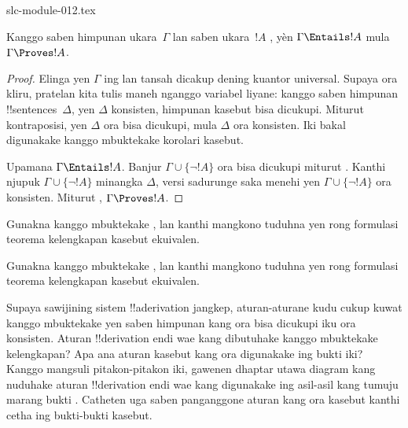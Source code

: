 \begin{filecontents*}[overwrite]{slc-module-012.tex}
\begin{cor}
Kanggo saben himpunan ukara~$\Gamma$ lan saben ukara~$!A$
, yèn $\Gamma \Entails !A$
mula $\Gamma \Proves !A$.
\end{cor}

\begin{proof}
Elinga yen $\Gamma$ ing  lan
 tansah dicakup dening kuantor universal. Supaya ora kliru,
pratelan  kita tulis maneh nganggo variabel
liyane: kanggo saben himpunan !!{sentence}s~$\Delta$, yen $\Delta$
konsisten, himpunan kasebut bisa dicukupi. Miturut kontraposisi, yen
$\Delta$ ora bisa dicukupi, mula $\Delta$ ora konsisten. Iki bakal
digunakake kanggo mbuktekake korolari kasebut.

Upamana $\Gamma \Entails !A$. Banjur $\Gamma \cup \{\lnot !A\}$ ora
bisa dicukupi miturut . Kanthi
njupuk $\Gamma \cup \{\lnot !A\}$ minangka $\Delta$, versi sadurunge
saka  menehi yen $\Gamma \cup \{\lnot !A\}$
ora konsisten. Miturut
,
$\Gamma \Proves !A$.
\end{proof}

\begin{prob}
Gunakna  kanggo mbuktekake
, lan kanthi mangkono tuduhna
yen rong formulasi teorema kelengkapan kasebut ekuivalen.
\end{prob}
\tagendprob

\begin{prob}
Gunakna  kanggo mbuktekake
, lan kanthi mangkono tuduhna
yen rong formulasi teorema kelengkapan kasebut ekuivalen.
\end{prob}
\tagendprob

\begin{prob}
Supaya sawijining sistem !!a{derivation} jangkep, aturan-aturane kudu cukup kuwat
kanggo mbuktekake yen saben himpunan kang ora bisa dicukupi iku ora
konsisten. Aturan !!{derivation} endi wae kang dibutuhake kanggo
mbuktekake kelengkapan? Apa ana aturan kasebut kang ora digunakake ing
bukti iki? Kanggo mangsuli pitakon-pitakon iki, gawenen dhaptar utawa
diagram kang nuduhake aturan !!{derivation} endi wae kang digunakake ing
asil-asil kang tumuju marang bukti
. Catheten uga saben panganggone
aturan kang ora kasebut kanthi cetha ing bukti-bukti kasebut.
\end{prob}
\tagendprob


\end{filecontents*}
